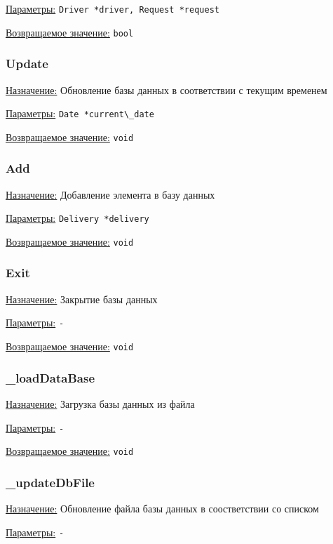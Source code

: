 \underline{Параметры:} \verb|Driver *driver, Request *request|

\underline{Возвращаемое значение:} \verb|bool|


\subsubsection{Update}

\underline{Назначение:}
Обновление базы данных в соответствии с текущим временем

\underline{Параметры:} \verb|Date *current\_date|

\underline{Возвращаемое значение:} \verb|void|


\subsubsection{Add}

\underline{Назначение:}
Добавление элемента в базу данных

\underline{Параметры:} \verb|Delivery *delivery|

\underline{Возвращаемое значение:} \verb|void|


\subsubsection{Exit}

\underline{Назначение:}
Закрытие базы данных

\underline{Параметры:} \verb|-|

\underline{Возвращаемое значение:} \verb|void|


\subsubsection{\_loadDataBase}

\underline{Назначение:}
Загрузка базы данных из файла

\underline{Параметры:} \verb|-|

\underline{Возвращаемое значение:} \verb|void|


\subsubsection{\_updateDbFile}

\underline{Назначение:}
Обновление файла базы данных в соостветствии со списком

\underline{Параметры:} \verb|-|


